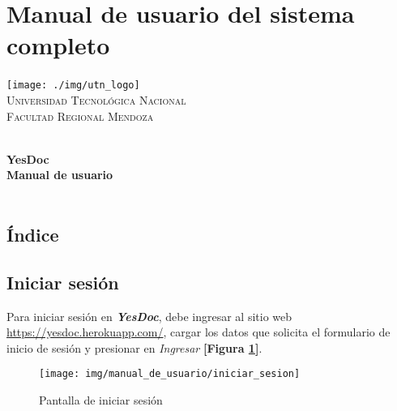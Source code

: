 


\section{Manual de usuario del sistema completo}
\label{manual_usuario}

\newpage

	\begin{center}
		
		\texttt{[image: ./img/utn\_logo]}~\\[1cm]
		
		{
			\textsc{\LARGE Universidad Tecnológica Nacional\\
				Facultad Regional Mendoza}\\[1.0cm]
		}
		
		\HRule \\[0.4cm]
		{ \Huge \bfseries YesDoc \\[0.2cm] }
		{ \LARGE \bfseries Manual de usuario \\[0.4cm] }
		\HRule \\[1.5cm]
		\vfill
		
	\end{center}

\newpage



\subsection*{Índice}
\startcontents

\newpage
\clearpage

\subsection{Iniciar sesión}
\begin{sloppypar}
Para iniciar sesión en \textbf{\textit{YesDoc}}, debe ingresar al sitio web \url{https://yesdoc.herokuapp.com/}, cargar los datos que solicita el formulario de inicio de sesión y presionar en \textit{Ingresar} \textbf{[Figura \ref{mu-iniciar_sesion}]}.
\end{sloppypar}
 \begin{figure}
 	\centering
 	\texttt{[image: img/manual\_de\_usuario/iniciar\_sesion]}
 	\caption{Pantalla de iniciar sesión}
 	\label{mu-iniciar_sesion}
 \end{figure}

